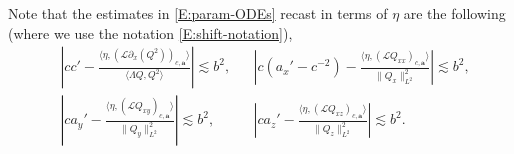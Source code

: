 \documentclass[12pt,letterpaper]{amsart}
\newcommand{\la}{\langle}
\newcommand{\ra}{\rangle}
\theoremstyle{remark}
\numberwithin{equation}{section}
\numberwithin{theorem}{section}
\numberwithin{table}{section}
\begin{document}
Note that the estimates in \eqref{E:param-ODEs} recast in terms of $\eta$ are the following (where we use the notation \eqref{E:shift-notation}),
\begin{equation}
\label{E:eta-ODEs}
\begin{aligned}
&\left|c c' - \frac{\la \eta, (\mathcal{L} \partial_x (Q^2))_{c,\mathbf{a}} \ra}{ \la \Lambda Q, Q^2 \ra} \right| \lesssim b^2,  && 
\left| c(a_x' -c^{-2}) - \frac{ \la \eta, (\mathcal{L} Q_{xx})_{c,\mathbf{a}} \ra }{ \|Q_x\|_{L^2}^2 } \right| \lesssim b^2, \\
&\left| c a_y' - \frac{ \la \eta, (\mathcal{L} Q_{xy})_{c,\mathbf{a}} \ra }{ \|Q_y\|_{L^2}^2 } \right| \lesssim b^2, && 
\left| c a_z' - \frac{ \la \eta, (\mathcal{L} Q_{xz})_{c,\mathbf{a}} \ra }{ \|Q_z\|_{L^2}^2 } \right| \lesssim b^2.
\end{aligned}
\end{equation}
\end{document}
